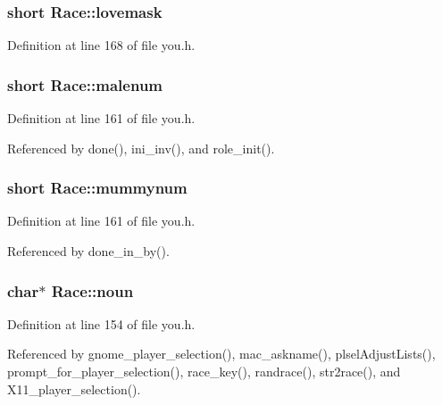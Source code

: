 \hypertarget{structRace_a4cec9b3b279a607c1d1e4beb13c1109c}{
\subsubsection[{lovemask}]{\setlength{\rightskip}{0pt plus 5cm}short Race\+::lovemask}}\label{structRace_a4cec9b3b279a607c1d1e4beb13c1109c}


Definition at line 168 of file you.\+h.

\hypertarget{structRace_a6dc454d6faae86cdc46c9a4f53f3f132}{
\subsubsection[{malenum}]{\setlength{\rightskip}{0pt plus 5cm}short Race\+::malenum}}\label{structRace_a6dc454d6faae86cdc46c9a4f53f3f132}


Definition at line 161 of file you.\+h.



Referenced by done(), ini\+\_\+inv(), and role\+\_\+init().

\hypertarget{structRace_aa3c20e0a53e012337991e56581ce29c5}{
\subsubsection[{mummynum}]{\setlength{\rightskip}{0pt plus 5cm}short Race\+::mummynum}}\label{structRace_aa3c20e0a53e012337991e56581ce29c5}


Definition at line 161 of file you.\+h.



Referenced by done\+\_\+in\+\_\+by().

\hypertarget{structRace_a5a94ed91d36f9a470a6bb7c5b28dd8a2}{
\subsubsection[{noun}]{ char$\ast$ Race\+::noun}}\label{structRace_a5a94ed91d36f9a470a6bb7c5b28dd8a2}


Definition at line 154 of file you.\+h.



Referenced by gnome\+\_\+player\+\_\+selection(), mac\+\_\+askname(), plsel\+Adjust\+Lists(), prompt\+\_\+for\+\_\+player\+\_\+selection(), race\+\_\+key(), randrace(), str2race(), and X11\+\_\+player\+\_\+selection().

